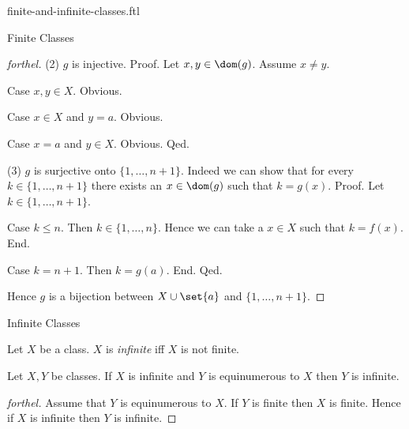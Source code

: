 \documentclass{naproche-library}
\begin{document}
\begin{smodule}[title=Finite and Infinite Classes]{finite-and-infinite-classes.ftl}
\begin{sfragment}{Finite Classes}
\begin{proof}[forthel]
    (2) $g$ is injective. \newline
    Proof.
      Let $x, y \in \dom(g)$.
      Assume $x \neq y$.
      
      Case $x, y \in X$. Obvious.

      Case $x \in X$ and $y = a$. Obvious.

      Case $x = a$ and $y \in X$. Obvious.
    Qed.

    (3) $g$ is surjective onto $\{ 1, \dots, n + 1 \}$.
    Indeed we can show that for every $k \in \{1, \dots, n + 1 \}$ there exists an $x \in \dom(g)$ such that $k = g(x)$. \newline
    Proof.
      Let $k \in \{ 1, \dots, n + 1 \}$.

      Case $k \leq n$.
        Then $k \in \{ 1, \dots, n \}$.
        Hence we can take a $x \in X$ such that $k = f(x)$.
      End.

      Case $k = n + 1$.
        Then $k = g(a)$.
      End.
    Qed.

    Hence $g$ is a bijection between $X \cup \set{a}$ and $\{ 1, \dots, n + 1 \}$.
  \end{proof}
\end{sfragment}

\begin{sfragment}{Infinite Classes}
  \begin{definition}[forthel,id=FOUNDATIONS_14_6612510618681344]
    Let $X$ be a class.
    $X$ is \emph{infinite} iff $X$ is not finite.
  \end{definition}

  \begin{proposition}[forthel,id=FOUNDATIONS_14_5814530911240192]
    Let $X, Y$ be classes.
    If $X$ is infinite and $Y$ is equinumerous to $X$ then $Y$ is infinite.
  \end{proposition}
  \begin{proof}[forthel]
    Assume that $Y$ is equinumerous to $X$.
    If $Y$ is finite then $X$ is finite.
    Hence if $X$ is infinite then $Y$ is infinite.
  \end{proof}
\end{sfragment}
\end{smodule}
\end{document}
